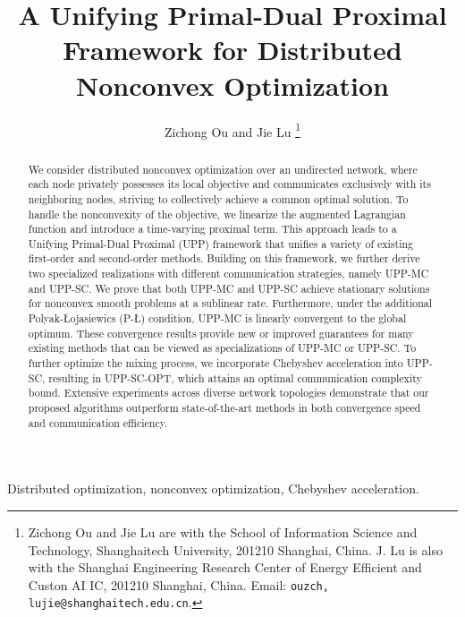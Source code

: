 \documentclass[12pt,draftcls,onecolumn]{IEEEtran}
\begin{document}
	
	\title{\LARGE \bf A Unifying Primal-Dual Proximal Framework for Distributed Nonconvex Optimization}
\author{Zichong Ou and Jie Lu%
\thanks{Zichong Ou and Jie Lu are with the School of Information Science and Technology, Shanghaitech University, 201210 Shanghai, China. J. Lu is also with the Shanghai Engineering Research Center of Energy Efficient and Custon AI IC, 201210 Shanghai, China. Email: {\tt\small ouzch, lujie@shanghaitech.edu.cn}.}
}
	\maketitle
	
	\begin{abstract}
We consider distributed nonconvex optimization over an undirected network, where each node privately possesses its local objective and communicates exclusively with its neighboring nodes, striving to collectively achieve a common optimal solution. To handle the nonconvexity of the objective, we linearize the augmented Lagrangian function and introduce a time-varying proximal term. This approach leads to a Unifying Primal-Dual Proximal (UPP) framework that unifies a variety of existing first-order and second-order methods. Building on this framework, we further derive two specialized realizations with different communication strategies, namely UPP-MC and UPP-SC. We prove that both UPP-MC and UPP-SC achieve stationary solutions for nonconvex smooth problems at a sublinear rate. Furthermore, under the additional Polyak-{\L}ojasiewics (P-{\L}) condition, UPP-MC is linearly convergent to the global optimum. These convergence results provide new or improved guarantees for many existing methods that can be viewed as specializations of UPP-MC or UPP-SC. To further optimize the mixing process, we incorporate Chebyshev acceleration into UPP-SC, resulting in UPP-SC-OPT, which attains an optimal communication complexity bound. Extensive experiments across diverse network topologies demonstrate that our proposed algorithms outperform state-of-the-art methods in both convergence speed and communication efficiency.
\end{abstract}

\begin{IEEEkeywords}
Distributed optimization, nonconvex optimization, Chebyshev acceleration.
\end{IEEEkeywords}
	
	
	
\end{document}
